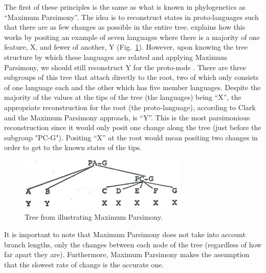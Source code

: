 \documentclass[draft,10pt]{article} %
\begin{document}
The first of these principles is the same as what is known in phylogenetics as ``Maximum Parsimony''. The idea is to reconstruct states in proto-languages such that there are as few changes as possible in the entire tree. \citet[17-22]{clark1976aspects} explains how this works by positing an example of seven languages where there is a majority of one feature, X, and fewer of another, Y (Fig.~\ref{fig:clark_tree}). However, upon knowing the tree structure by which these languages are related and applying Maximum Parsimony, we should still reconstruct Y for the proto-node . There are three subgroups of this tree that attach directly to the root, two of which only consists of one language each and the other which has five member languages. Despite the majority of the values at the tips of the tree (the languages) being ``X'', the appropriate reconstruction for the root (the proto-language), according to Clark and the Maximum Parsimony approach, is ``Y''. This is the most parsimonious reconstruction since it would only posit one change along the tree (just before the subgroup "PC-G"). Positing ``X'' at the root would mean positing two changes in order to get to the known states of the tips. 

\begin{figure}
\centering
\includegraphics[width=8cm]{illustrations/Clark_1977_tree.png}
\caption{{Tree from \citet[19]{clark1976aspects} illustrating Maximum Parsimony.}}
\label{fig:clark_tree}
\end{figure}

It is important to note that Maximum Parsimony does not take into account branch lengths, only the changes between each node of the tree (regardless of how far apart they are). Furthermore, Maximum Parsimony makes the assumption that the slowest rate of change is the accurate one. %



\end{document}
